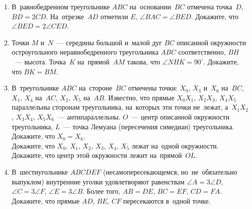 \begin{enumerate}
\item
В~равнобедренном треугольнике $ABC$ на~основании~$BC$ отмечена точка~$D$,
$BD = 2 CD$.
На~отрезке~$AD$ отметили $E$, $\angle BAC = \angle BED$.
Докажите, что $\angle BED = 2 \angle CED$.

\item
Точки $M$ и~$N$~--- середины большой и~малой дуг $BC$ описанной окружности
остроугольного неравнобедренного треугольника $ABC$ соответственно,
$BH$~--- высота.
Точка~$K$ на~прямой~$AM$ такова, что $\angle NHK = 90^{\circ}$.
Докажите, что $BK = BM$.

\item
В~треугольнике $ABC$ на~стороне~$BC$ отмечены точки:
$X_0$, $X_3$ и~$X_6$ на~$BC$,
$X_1$, $X_4$ на~$AC$, $X_2$, $X_5$ на~$AB$.
Известно, что прямые $X_0 X_1$, $X_2 X_3$, $X_4 X_5$ параллельны сторонам
треугольника, на~которых эти точки не~лежат,
а~$X_1 X_2$, $X_3 X_4$, $X_5 X_6$~--- антипараллельны.
$O$~--- центр описанной окружности треугольника, $L$~--- точка Лемуана
(пересечения симедиан) треугольника.
\\
\subproblem
Докажите, что $X_0 = X_6$.
\\
\subproblem
Докажите, что $X_0$, $X_1$, $X_2$, $X_3$, $X_4$, $X_5$ лежат на~одной
окружности.
\\
\subproblem
Докажите, что центр этой окружности лежит на~прямой~$OL$.

\item
В~шестиугольнике $ABCDEF$ (несамопересекающемся, но~не~обязательно выпуклом)
внутренние уголки удовлетворяют равенствам
$\angle A = 3 \angle D$, $\angle C = 3 \angle F$, $\angle E = 3 \angle B$.
Более того, $AB = DE$, $BC = EF$, $CD = FA$.
Докажите, что прямые $AD$, $BE$, $CF$ пересекаются в~одной точке.

\end{enumerate}

